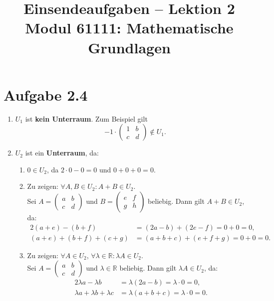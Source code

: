 \documentclass[a4paper,12pt]{article}
\title{Einsendeaufgaben -- Lektion 2\\[0.5em]
\large Modul 61111: Mathematische Grundlagen}
\author{}
\date{}
\begin{document}
\maketitle

\section*{Aufgabe 2.4}

\begin{enumerate}[label=\alph*)]

\item $U_1$ ist \textbf{kein Unterraum}. Zum Beispiel gilt
\[
  -1 \cdot \begin{pmatrix}1 & b \\ c & d\end{pmatrix} \notin U_1.
\]

\item $U_2$ ist ein \textbf{Unterraum}, da:

\begin{enumerate}[label=\arabic*.]
  \item $0 \in U_2$, da $2 \cdot 0 - 0 = 0$ und $0 + 0 + 0 = 0$.

  \item Zu zeigen: $\forall A, B \in U_2 : A + B \in U_2$.\\
  Sei $A = \begin{pmatrix}a & b \\ c & d\end{pmatrix}$ und
  $B = \begin{pmatrix}e & f \\ g & h\end{pmatrix}$ beliebig.
  Dann gilt $A + B \in U_2$, da:
  \begin{align*}
    2(a+e) - (b+f) &= (2a-b) + (2e-f) = 0 + 0 = 0, \\
    (a+e) + (b+f) + (c+g) &= (a+b+c) + (e+f+g) = 0 + 0 = 0.
  \end{align*}

  \item Zu zeigen: $\forall A \in U_2,\, \forall \lambda \in \mathbb{R} : \lambda A \in U_2$.\\
  Sei $A = \begin{pmatrix}a & b \\ c & d\end{pmatrix}$ und $\lambda \in \mathbb{R}$ beliebig.
  Dann gilt $\lambda A \in U_2$, da:
  \begin{align*}
    2\lambda a - \lambda b &= \lambda(2a - b) = \lambda \cdot 0 = 0, \\
    \lambda a + \lambda b + \lambda c &= \lambda(a + b + c) = \lambda \cdot 0 = 0.
  \end{align*}
\end{enumerate}


\end{enumerate}
\end{document}
